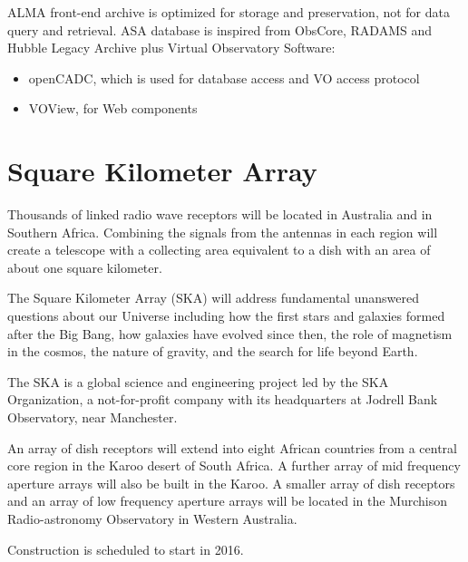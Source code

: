 ALMA front-end archive is optimized for storage and preservation, not for data query and retrieval. ASA database is inspired from ObsCore, RADAMS and Hubble Legacy Archive plus Virtual Observatory Software:

\begin{itemize}
\item openCADC, which is used for database access and VO access protocol
\item VOView, for Web components
\end{itemize}


\section{Square Kilometer Array}

Thousands of linked radio wave receptors will be located in Australia and in Southern Africa. Combining the signals from the antennas in each region will create a telescope with a collecting area equivalent to a dish with an area of about one square kilometer.  \newline

The Square Kilometer Array (SKA) will address fundamental unanswered questions about our Universe including how the first stars and galaxies formed after the Big Bang, how galaxies have evolved since then, the role of magnetism in the cosmos, the nature of gravity, and the search for life beyond Earth.  \newline

The SKA is a global science and engineering project led by the SKA Organization, a not-for-profit company with its headquarters at Jodrell Bank Observatory, near Manchester.  \newline

An array of dish receptors will extend into eight African countries from a central core region in the Karoo desert of South Africa. A further array of mid frequency aperture arrays will also be built in the Karoo. A smaller array of dish receptors and an array of low frequency aperture arrays will be located in the Murchison Radio-astronomy Observatory in Western Australia. \newline

Construction is scheduled to start in 2016.


